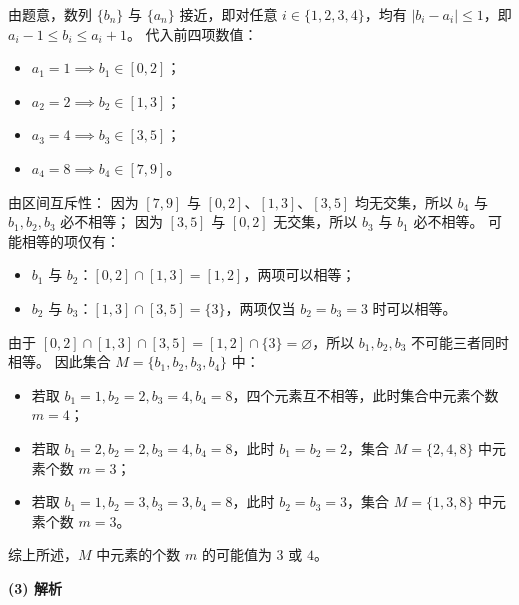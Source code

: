 \begin{answer}
由题意，数列 $\{b_n\}$ 与 $\{a_n\}$ 接近，即对任意 $i \in \{1, 2, 3, 4\}$，均有 $|b_i - a_i| \le 1$，即 $a_i - 1 \le b_i \le a_i + 1$。
代入前四项数值：
\begin{itemize}
\item $a_1 = 1 \implies b_1 \in [0, 2]$；
\item $a_2 = 2 \implies b_2 \in [1, 3]$；
\item $a_3 = 4 \implies b_3 \in [3, 5]$；
\item $a_4 = 8 \implies b_4 \in [7, 9]$。
\end{itemize}
由区间互斥性：
因为 $[7, 9]$ 与 $[0, 2]$、$[1, 3]$、$[3, 5]$ 均无交集，所以 $b_4$ 与 $b_1, b_2, b_3$ 必不相等；
因为 $[3, 5]$ 与 $[0, 2]$ 无交集，所以 $b_3$ 与 $b_1$ 必不相等。
可能相等的项仅有：
\begin{itemize}
\item $b_1$ 与 $b_2$：$[0, 2] \cap [1, 3] = [1, 2]$，两项可以相等；
\item $b_2$ 与 $b_3$：$[1, 3] \cap [3, 5] = \{3\}$，两项仅当 $b_2 = b_3 = 3$ 时可以相等。
\end{itemize}
由于 $[0, 2] \cap [1, 3] \cap [3, 5] = [1, 2] \cap \{3\} = \varnothing$，所以 $b_1, b_2, b_3$ 不可能三者同时相等。
因此集合 $M = \{b_1, b_2, b_3, b_4\}$ 中：
\begin{itemize}
\item 若取 $b_1 = 1, b_2 = 2, b_3 = 4, b_4 = 8$，四个元素互不相等，此时集合中元素个数 $m = 4$；
\item 若取 $b_1 = 2, b_2 = 2, b_3 = 4, b_4 = 8$，此时 $b_1 = b_2 = 2$，集合 $M = \{2, 4, 8\}$ 中元素个数 $m = 3$；
\item 若取 $b_1 = 1, b_2 = 3, b_3 = 3, b_4 = 8$，此时 $b_2 = b_3 = 3$，集合 $M = \{1, 3, 8\}$ 中元素个数 $m = 3$。
\end{itemize}
综上所述，$M$ 中元素的个数 $m$ 的可能值为 $3$ 或 $4$。

\textbf{(3) 解析}


\end{answer}

